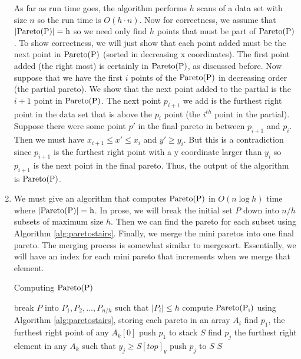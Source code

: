 \documentclass[11pt]{article}
\newcommand{\pareto}[1]{\rm{Pareto}(#1)}
\begin{document}
\begin{enumerate}
    As far as run time goes, the algorithm performs $h$ scans of a data set with size $n$ so the run time is $O(h \cdot n)$.
    Now for correctness, we assume that $|\pareto{P}| = h$ so we need only find $h$ points that must be part of $\pareto{P}$.
    To show correctness, we will just show that each point added must be the next point in $\pareto{P}$ (sorted in decreasing x coordinates).
    The first point added (the right most) is certainly in $\pareto{P}$, as discussed before.
    Now suppose that we have the first $i$ points of the $\pareto{P}$ in decreasing order (the partial pareto).
    We show that the next point added to the partial is the $i+1$ point in $\pareto{P}$.
    The next point $p_{i+1}$ we add is the furthest right point in the data set that is above the $p_i$ point (the $i^{th}$ point in the partial).
    Suppose there were some point $p'$ in the final pareto in between $p_{i+1}$ and $p_i$.
    Then we must have $x_{i+1} \leq x' \leq x_i$ and $y' \geq y_i$.
    But this is a contradiction since $p_{i+1}$ is the furthest right point with a y coordinate larger than $y_i$ so $p_{i+1}$ is the next point in the final pareto.
    Thus, the output of the algorithm is $\pareto{P}$.

    \item We must give an algorithm that computes $\pareto{P}$ in $O(n \log h)$ time where $|\pareto{P}| = h$.
    In prose, we will break the initial set $P$ down into $n/h$ subsets of maximum size $h$.
    Then we can find the pareto for each subset using Algorithm \ref{alg:paretostairs}.
    Finally, we merge the mini paretos into one final pareto.
    The merging process is somewhat similar to mergesort.
    Essentially, we will have an index for each mini pareto that increments when we merge that element.

    \begin{algorithm}
    \caption{Computing $\pareto{P}$}
    \label{alg:paretochan}
        \begin{algorithmic}[1]
            \State break $P$ into $P_1, P_2, ..., P_{n/h}$ such that $|P_i| \leq h$
            \State compute $\pareto{P_i}$ using Algorithm \ref{alg:paretostairs}, storing each pareto in an array $A_i$
            \State find $p_1$, the furthest right point of any $A_k[0]$
            \State push $p_1$ to stack $S$
                \State find $p_j$ the furthest right element in any $A_k$ such that $y_j \geq S[top]_y$
                \State push $p_j$ to $S$
            \EndFor
            \State \Return $S$
        \EndFunction
        \end{algorithmic}
    \end{algorithm}


\end{enumerate}
\end{document}
